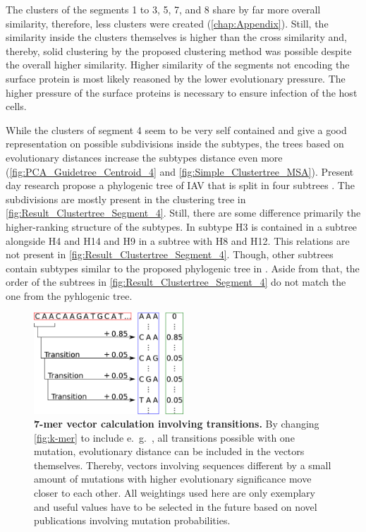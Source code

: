 \vspace{1em}

The clusters of the segments 1 to 3, 5, 7, and 8 share by far more overall similarity, therefore, less clusters were created (\autoref{chap:Appendix}). Still, the similarity inside the clusters themselves is higher than the cross similarity and, thereby, solid clustering by the proposed clustering method was possible despite the overall higher similarity. Higher similarity of the segments not encoding the surface protein is most likely reasoned by the lower evolutionary pressure. The higher pressure of the surface proteins is necessary to ensure infection of the host cells. 

\vspace{1em}

While the clusters of segment 4 seem to be very self contained and give a good representation on possible subdivisions inside the subtypes, the trees based on evolutionary distances increase the subtypes distance even more (\autoref{fig:PCA_Guidetree_Centroid_4} and \autoref{fig:Simple_Clustertree_MSA}). Present day research propose a phylogenic tree of \gls{IAV} that is split in four subtrees \autocite{wei_next-generation_2020}. The subdivisions are mostly present in the clustering tree in \autoref{fig:Result_Clustertree_Segment_4}. Still, there are some difference primarily the higher-ranking structure of the subtypes. In \textcite{wei_next-generation_2020} subtype H3 is contained in a subtree alongside H4 and H14 and H9 in a subtree with H8 and H12. This relations are not present in \autoref{fig:Result_Clustertree_Segment_4}. Though, other subtrees contain subtypes similar to the proposed phylogenic tree in \textcite{wei_next-generation_2020}. Aside from that, the order of the subtrees in \autoref{fig:Result_Clustertree_Segment_4} do not match the one from the pyhlogenic tree.

\begin{figure}[!hbt]
    \centering
    \includegraphics[width=0.5\textwidth]{Graphics/Transition.pdf}
    \caption[7-mer vector calculation involving transitions]{\textbf{7-mer vector calculation involving transitions.} By changing \autoref{fig:k-mer} to include e.~g.~, all transitions possible with one mutation, evolutionary distance can be included in the vectors themselves. Thereby, vectors involving sequences different by a small amount of mutations with higher evolutionary significance move closer to each other. All weightings used here are only exemplary and useful values have to be selected in the future based on novel publications  involving mutation probabilities.}
    \label{fig:trans}
\end{figure}

